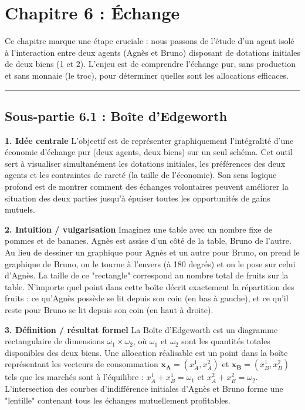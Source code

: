 \documentclass[11pt, a4paper]{report}
\begin{document}
\chapter{Chapitre 6 : Échange}


Ce chapitre marque une étape cruciale : nous passons de l'étude d'un agent isolé à l'interaction entre deux agents (Agnès et Bruno) disposant de dotations initiales de deux biens (1 et 2). L'enjeu est de comprendre l'échange pur, sans production et sans monnaie (le troc), pour déterminer quelles sont les allocations efficaces.

\vspace{1cm}\hrule\vspace{1cm}

\section{Sous-partie 6.1 : Boîte d'Edgeworth}

\textbf{1. Idée centrale}
L'objectif est de représenter graphiquement l'intégralité d'une économie d'échange pur (deux agents, deux biens) sur un seul schéma. Cet outil sert à visualiser simultanément les dotations initiales, les préférences des deux agents et les contraintes de rareté (la taille de l'économie). Son sens logique profond est de montrer comment des échanges volontaires peuvent améliorer la situation des deux parties jusqu'à épuiser toutes les opportunités de gains mutuels.

\textbf{2. Intuition / vulgarisation}
Imaginez une table avec un nombre fixe de pommes et de bananes. Agnès est assise d'un côté de la table, Bruno de l'autre. Au lieu de dessiner un graphique pour Agnès et un autre pour Bruno, on prend le graphique de Bruno, on le tourne à l'envers (à 180 degrés) et on le pose sur celui d'Agnès. La taille de ce "rectangle" correspond au nombre total de fruits sur la table. N'importe quel point dans cette boîte décrit exactement la répartition des fruits : ce qu'Agnès possède se lit depuis son coin (en bas à gauche), et ce qu'il reste pour Bruno se lit depuis son coin (en haut à droite).

\textbf{3. Définition / résultat formel}
La Boîte d'Edgeworth est un diagramme rectangulaire de dimensions $\omega_1 \times \omega_2$, où $\omega_1$ et $\omega_2$ sont les quantités totales disponibles des deux biens. 
Une allocation réalisable est un point dans la boîte représentant les vecteurs de consommation $\mathbf{x_A} = (x_A^1, x_A^2)$ et $\mathbf{x_B} = (x_B^1, x_B^2)$ tels que les marchés sont à l'équilibre : $x_A^1 + x_B^1 = \omega_1$ et $x_A^2 + x_B^2 = \omega_2$.
L'intersection des courbes d'indifférence initiales d'Agnès et Bruno forme une "lentille" contenant tous les échanges mutuellement profitables. 
\end{document}
